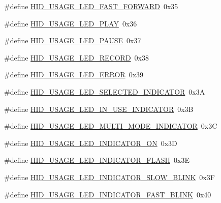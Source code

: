 \begin{DoxyCompactItemize}
\#define \hyperlink{group__USBD__HID_ga3a4a93c2db00474a8353a653457462ac}{H\-I\-D\-\_\-\-U\-S\-A\-G\-E\-\_\-\-L\-E\-D\-\_\-\-F\-A\-S\-T\-\_\-\-F\-O\-R\-W\-A\-R\-D}~0x35
\item 
\#define \hyperlink{group__USBD__HID_ga0e1d5a888297641ba60e0d339384b6e3}{H\-I\-D\-\_\-\-U\-S\-A\-G\-E\-\_\-\-L\-E\-D\-\_\-\-P\-L\-A\-Y}~0x36
\item 
\#define \hyperlink{group__USBD__HID_ga661f4369dd90713ad94634190e4e0014}{H\-I\-D\-\_\-\-U\-S\-A\-G\-E\-\_\-\-L\-E\-D\-\_\-\-P\-A\-U\-S\-E}~0x37
\item 
\#define \hyperlink{group__USBD__HID_ga75cd4f041b28d055b64f127c45d5c1a6}{H\-I\-D\-\_\-\-U\-S\-A\-G\-E\-\_\-\-L\-E\-D\-\_\-\-R\-E\-C\-O\-R\-D}~0x38
\item 
\#define \hyperlink{group__USBD__HID_gacf4628b5d2ec9d62ac2fe7e73d58c692}{H\-I\-D\-\_\-\-U\-S\-A\-G\-E\-\_\-\-L\-E\-D\-\_\-\-E\-R\-R\-O\-R}~0x39
\item 
\#define \hyperlink{group__USBD__HID_ga3eab7def711983efe709356bb64ee3f7}{H\-I\-D\-\_\-\-U\-S\-A\-G\-E\-\_\-\-L\-E\-D\-\_\-\-S\-E\-L\-E\-C\-T\-E\-D\-\_\-\-I\-N\-D\-I\-C\-A\-T\-O\-R}~0x3\-A
\item 
\#define \hyperlink{group__USBD__HID_ga5989c594ce7bfd94817de1ac6ed8c291}{H\-I\-D\-\_\-\-U\-S\-A\-G\-E\-\_\-\-L\-E\-D\-\_\-\-I\-N\-\_\-\-U\-S\-E\-\_\-\-I\-N\-D\-I\-C\-A\-T\-O\-R}~0x3\-B
\item 
\#define \hyperlink{group__USBD__HID_ga839ad385878569f6a9d3b90d8a38cb14}{H\-I\-D\-\_\-\-U\-S\-A\-G\-E\-\_\-\-L\-E\-D\-\_\-\-M\-U\-L\-T\-I\-\_\-\-M\-O\-D\-E\-\_\-\-I\-N\-D\-I\-C\-A\-T\-O\-R}~0x3\-C
\item 
\#define \hyperlink{group__USBD__HID_ga48aae293742fcfc360e51a3a15fde96a}{H\-I\-D\-\_\-\-U\-S\-A\-G\-E\-\_\-\-L\-E\-D\-\_\-\-I\-N\-D\-I\-C\-A\-T\-O\-R\-\_\-\-O\-N}~0x3\-D
\item 
\#define \hyperlink{group__USBD__HID_ga4f1b587abec632b31d8635c75b43a803}{H\-I\-D\-\_\-\-U\-S\-A\-G\-E\-\_\-\-L\-E\-D\-\_\-\-I\-N\-D\-I\-C\-A\-T\-O\-R\-\_\-\-F\-L\-A\-S\-H}~0x3\-E
\item 
\#define \hyperlink{group__USBD__HID_ga5f0a0abd6759a915a89997b1d7fe006f}{H\-I\-D\-\_\-\-U\-S\-A\-G\-E\-\_\-\-L\-E\-D\-\_\-\-I\-N\-D\-I\-C\-A\-T\-O\-R\-\_\-\-S\-L\-O\-W\-\_\-\-B\-L\-I\-N\-K}~0x3\-F
\item 
\#define \hyperlink{group__USBD__HID_ga539ee008fdc26641e2ea9b2fb0065ab8}{H\-I\-D\-\_\-\-U\-S\-A\-G\-E\-\_\-\-L\-E\-D\-\_\-\-I\-N\-D\-I\-C\-A\-T\-O\-R\-\_\-\-F\-A\-S\-T\-\_\-\-B\-L\-I\-N\-K}~0x40
\item 

\end{DoxyCompactItemize}
